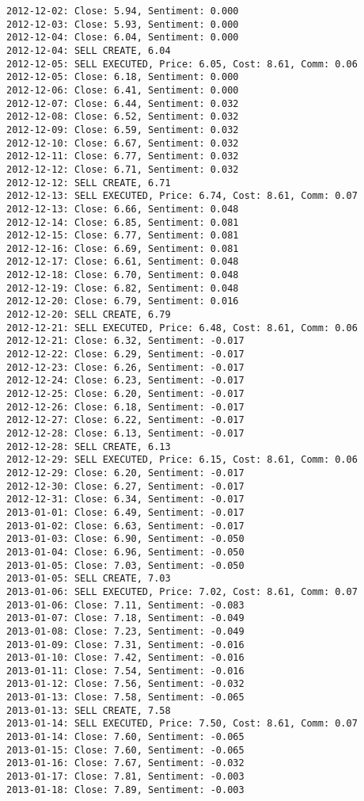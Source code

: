 \documentclass[11pt]{article}
\begin{document}
\begin{Verbatim}[commandchars=\\\{\}]
2012-12-02: Close: 5.94, Sentiment: 0.000
2012-12-03: Close: 5.93, Sentiment: 0.000
2012-12-04: Close: 6.04, Sentiment: 0.000
2012-12-04: SELL CREATE, 6.04
2012-12-05: SELL EXECUTED, Price: 6.05, Cost: 8.61, Comm: 0.06
2012-12-05: Close: 6.18, Sentiment: 0.000
2012-12-06: Close: 6.41, Sentiment: 0.000
2012-12-07: Close: 6.44, Sentiment: 0.032
2012-12-08: Close: 6.52, Sentiment: 0.032
2012-12-09: Close: 6.59, Sentiment: 0.032
2012-12-10: Close: 6.67, Sentiment: 0.032
2012-12-11: Close: 6.77, Sentiment: 0.032
2012-12-12: Close: 6.71, Sentiment: 0.032
2012-12-12: SELL CREATE, 6.71
2012-12-13: SELL EXECUTED, Price: 6.74, Cost: 8.61, Comm: 0.07
2012-12-13: Close: 6.66, Sentiment: 0.048
2012-12-14: Close: 6.85, Sentiment: 0.081
2012-12-15: Close: 6.77, Sentiment: 0.081
2012-12-16: Close: 6.69, Sentiment: 0.081
2012-12-17: Close: 6.61, Sentiment: 0.048
2012-12-18: Close: 6.70, Sentiment: 0.048
2012-12-19: Close: 6.82, Sentiment: 0.048
2012-12-20: Close: 6.79, Sentiment: 0.016
2012-12-20: SELL CREATE, 6.79
2012-12-21: SELL EXECUTED, Price: 6.48, Cost: 8.61, Comm: 0.06
2012-12-21: Close: 6.32, Sentiment: -0.017
2012-12-22: Close: 6.29, Sentiment: -0.017
2012-12-23: Close: 6.26, Sentiment: -0.017
2012-12-24: Close: 6.23, Sentiment: -0.017
2012-12-25: Close: 6.20, Sentiment: -0.017
2012-12-26: Close: 6.18, Sentiment: -0.017
2012-12-27: Close: 6.22, Sentiment: -0.017
2012-12-28: Close: 6.13, Sentiment: -0.017
2012-12-28: SELL CREATE, 6.13
2012-12-29: SELL EXECUTED, Price: 6.15, Cost: 8.61, Comm: 0.06
2012-12-29: Close: 6.20, Sentiment: -0.017
2012-12-30: Close: 6.27, Sentiment: -0.017
2012-12-31: Close: 6.34, Sentiment: -0.017
2013-01-01: Close: 6.49, Sentiment: -0.017
2013-01-02: Close: 6.63, Sentiment: -0.017
2013-01-03: Close: 6.90, Sentiment: -0.050
2013-01-04: Close: 6.96, Sentiment: -0.050
2013-01-05: Close: 7.03, Sentiment: -0.050
2013-01-05: SELL CREATE, 7.03
2013-01-06: SELL EXECUTED, Price: 7.02, Cost: 8.61, Comm: 0.07
2013-01-06: Close: 7.11, Sentiment: -0.083
2013-01-07: Close: 7.18, Sentiment: -0.049
2013-01-08: Close: 7.23, Sentiment: -0.049
2013-01-09: Close: 7.31, Sentiment: -0.016
2013-01-10: Close: 7.42, Sentiment: -0.016
2013-01-11: Close: 7.54, Sentiment: -0.016
2013-01-12: Close: 7.56, Sentiment: -0.032
2013-01-13: Close: 7.58, Sentiment: -0.065
2013-01-13: SELL CREATE, 7.58
2013-01-14: SELL EXECUTED, Price: 7.50, Cost: 8.61, Comm: 0.07
2013-01-14: Close: 7.60, Sentiment: -0.065
2013-01-15: Close: 7.60, Sentiment: -0.065
2013-01-16: Close: 7.67, Sentiment: -0.032
2013-01-17: Close: 7.81, Sentiment: -0.003
2013-01-18: Close: 7.89, Sentiment: -0.003

\end{Verbatim}
\end{document}
